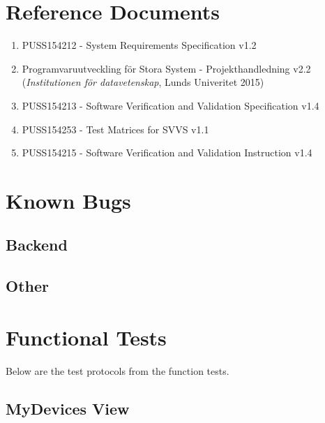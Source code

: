 \documentclass[a4paper]{article}
\begin{document}
\setcounter{tocdepth}{2}
\tableofcontents
\newpage
{}


\section*{Reference Documents}
\begin{enumerate}
\item PUSS154212 - System Requirements Specification v1.2 \label{refdocs:srs} 
\item Programvaruutveckling för Stora System - Projekthandledning v2.2 \newline (\textit{Institutionen för datavetenskap}, Lunds Univeritet 2015) \label{refdocs:projekthandledning}
\item PUSS154213 - Software Verification and Validation Specification v1.4 \label{refdocs:SVVS}
\item PUSS154253 - Test Matrices for SVVS v1.1 \label{refdocs:matrices}
\item PUSS154215 - Software Verification and Validation Instruction v1.4 \label{refdocs:SVVI}
\end{enumerate}

\section{Known Bugs}

\subsection{Backend}

\subsection{Other}

\clearpage
\section{Functional Tests}
Below are the test protocols from the function tests.

\subsection{MyDevices View}



\end{document}
